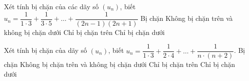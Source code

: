 \begin{ex}%
	Xét tính bị chặn của các dãy số $(u_n)$, biết  $u_n=\dfrac{1}{1\cdot 3}+\dfrac{1}{3\cdot 5}+\ldots +\dfrac{1}{\left(2n-1\right)\left(2n+1\right)}$
	 \choice
		{\True Bị chặn} 
		{Không bị chặn trên và không bị  chặn dưới}
		{Chỉ bị  chặn trên}
		{Chỉ bị chặn  dưới}
\end{ex}

\begin{ex}%
	Xét tính bị  chặn của dãy số $(u_n)$, biết $u_n=\dfrac{1}{1\cdot 3}+\dfrac{1}{2\cdot 4}+\ldots+\dfrac{1}{n\cdot (n+2)}$.
	\choice 
		{\True Bị  chặn}
		{Không bị chặn trên và không bị  chặn dưới}
		{Chỉ bị chặn trên} 
		{Chỉ bị chặn dưới} 
\end{ex}

